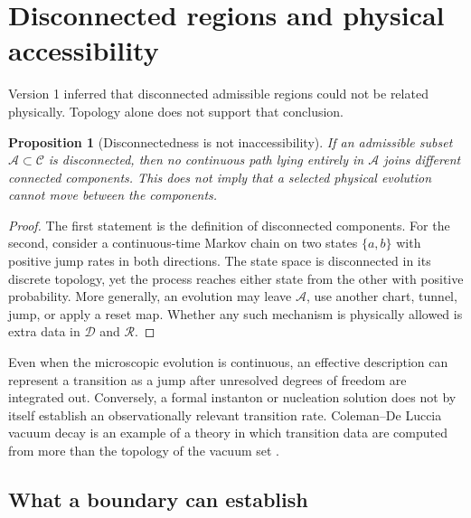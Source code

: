\documentclass[11pt]{article}
\newtheorem{proposition}[theorem]{Proposition}
\theoremstyle{definition}
\theoremstyle{remark}
\newcommand{\cA}{\mathcal A}
\newcommand{\cC}{\mathcal C}
\newcommand{\cD}{\mathcal D}
\newcommand{\cR}{\mathcal R}
\newcommand{\1}{\mathbf 1}
\begin{document}
\section{Disconnected regions and physical accessibility}
\label{sec:connected}

Version 1 inferred that disconnected admissible regions could not be
related physically.  Topology alone does not support that conclusion.

\begin{proposition}[Disconnectedness is not inaccessibility]
\label{prop:disconnect}
If an admissible subset \(\cA\subset\cC\) is disconnected, then no
continuous path lying entirely in \(\cA\) joins different connected
components.  This does not imply that a selected physical evolution cannot
move between the components.
\end{proposition}

\begin{proof}
The first statement is the definition of disconnected components.  For
the second, consider a continuous-time Markov chain on two states
\(\{a,b\}\) with positive jump rates in both directions.  The state space
is disconnected in its discrete topology, yet the process reaches either
state from the other with positive probability.  More generally, an
evolution may leave \(\cA\), use another chart, tunnel, jump, or apply a
reset map.  Whether any such mechanism is physically allowed is extra
data in \(\cD\) and \(\cR\).
\end{proof}

Even when the microscopic evolution is continuous, an effective
description can represent a transition as a jump after unresolved degrees
of freedom are integrated out.  Conversely, a formal instanton or
nucleation solution does not by itself establish an observationally
relevant transition rate.  Coleman--De Luccia vacuum decay is an example
of a theory in which transition data are computed from more than the
topology of the vacuum set \cite{ColemanDeLuccia1980}.

\subsection{What a boundary can establish}
\end{document}

